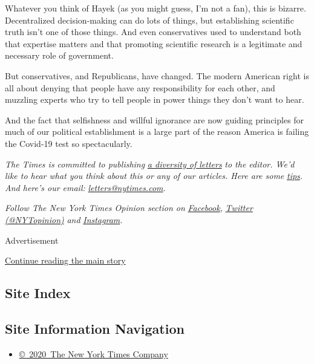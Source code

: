Whatever you think of Hayek (as you might guess, I'm not a fan), this is
bizarre. Decentralized decision-making can do lots of things, but
establishing scientific truth isn't one of those things. And even
conservatives used to understand both that expertise matters and that
promoting scientific research is a legitimate and necessary role of
government.

But conservatives, and Republicans, have changed. The modern American
right is all about denying that people have any responsibility for each
other, and muzzling experts who try to tell people in power things they
don't want to hear.

And the fact that selfishness and willful ignorance are now guiding
principles for much of our political establishment is a large part of
the reason America is failing the Covid-19 test so spectacularly.

\emph{The Times is committed to publishing}
\href{https://www.nytimes.com/2019/01/31/opinion/letters/letters-to-editor-new-york-times-women.html}{\emph{a
diversity of letters}} \emph{to the editor. We'd like to hear what you
think about this or any of our articles. Here are some}
\href{https://help.nytimes.com/hc/en-us/articles/115014925288-How-to-submit-a-letter-to-the-editor}{\emph{tips}}\emph{.
And here's our email:}
\href{mailto:letters@nytimes.com}{\emph{letters@nytimes.com}}\emph{.}

\emph{Follow The New York Times Opinion section on}
\href{https://www.facebook.com/nytopinion}{\emph{Facebook}}\emph{,}
\href{http://twitter.com/NYTOpinion}{\emph{Twitter (@NYTopinion)}}
\emph{and}
\href{https://www.instagram.com/nytopinion/}{\emph{Instagram}}\emph{.}

Advertisement

\protect\hyperlink{after-bottom}{Continue reading the main story}

\hypertarget{site-index}{%
\subsection{Site Index}\label{site-index}}

\hypertarget{site-information-navigation}{%
\subsection{Site Information
Navigation}\label{site-information-navigation}}

\begin{itemize}
\tightlist
\item
  \href{https://help.nytimes.com/hc/en-us/articles/115014792127-Copyright-notice}{©~2020~The
  New York Times Company}
\end{itemize}

